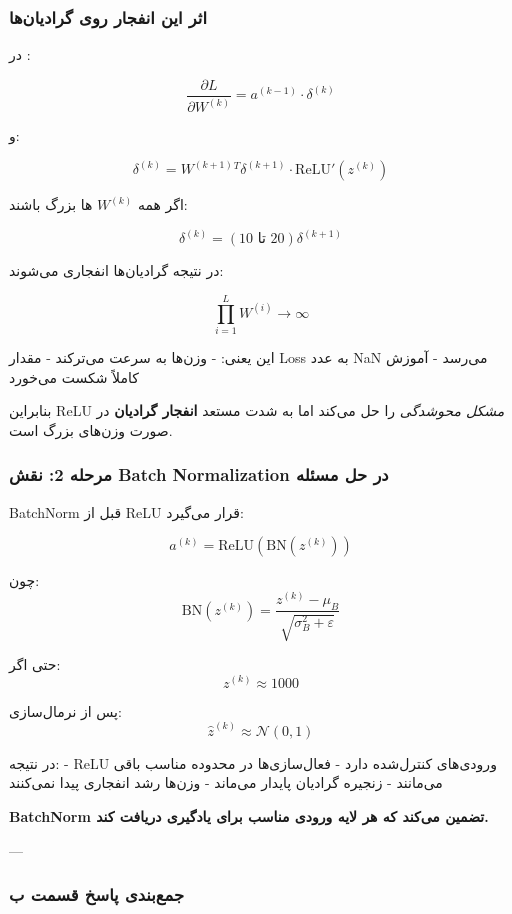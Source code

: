 \documentclass{article}
\begin{document}
\subsubsection*{اثر این انفجار روی گرادیان‌ها}

در :

\[
\frac{\partial L}{\partial W^{(k)}} = a^{(k-1)} \cdot \delta^{(k)}
\]

و:

\[
\delta^{(k)} = W^{(k+1)}{}^T \delta^{(k+1)} \cdot \text{ReLU}'(z^{(k)})
\]

اگر همه $W^{(k)}$ ها بزرگ باشند:

\[
\delta^{(k)} = (10\text{ تا }20) \delta^{(k+1)}
\]

در نتیجه گرادیان‌ها انفجاری می‌شوند:

\[
\prod_{i=1}^{L} W^{(i)} \rightarrow \infty
\]

این یعنی:
- وزن‌ها به سرعت می‌ترکند  
- مقدار Loss به عدد NaN می‌رسد  
- آموزش کاملاً شکست می‌خورد  

بنابراین ReLU \emph{مشکل محوشدگی} را حل می‌کند  
اما به شدت مستعد \textbf{انفجار گرادیان} در صورت وزن‌های بزرگ است.

\subsubsection*{مرحله 2: نقش Batch Normalization در حل مسئله}

BatchNorm قبل از ReLU قرار می‌گیرد:

\[
a^{(k)} = \text{ReLU}( \text{BN}(z^{(k)}) )
\]

چون:
\[
\text{BN}(z^{(k)}) = \frac{z^{(k)} - \mu_B}{\sqrt{\sigma_B^2 + \varepsilon}}
\]

حتی اگر:
\[
z^{(k)} \approx 1000
\]

پس از نرمال‌سازی:
\[
\hat{z}^{(k)} \approx \mathcal{N}(0,1)
\]

در نتیجه:
- ReLU ورودی‌های کنترل‌شده دارد  
- فعال‌سازی‌ها در محدوده مناسب باقی می‌مانند  
- زنجیره گرادیان پایدار می‌ماند  
- وزن‌ها رشد انفجاری پیدا نمی‌کنند  

\textbf{BatchNorm تضمین می‌کند که هر لایه ورودی مناسب برای یادگیری دریافت کند.}

---

\subsubsection*{جمع‌بندی پاسخ قسمت ب}
\end{document}
